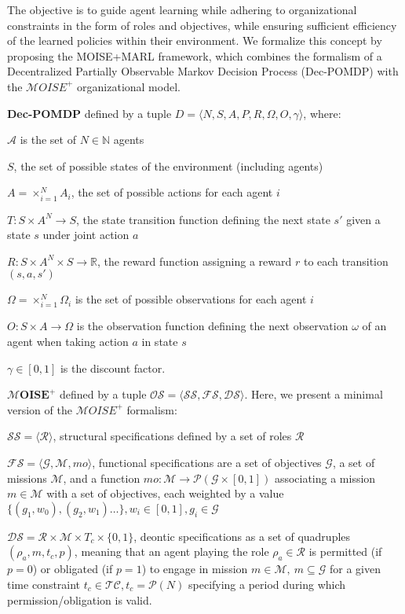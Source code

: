 \documentclass[sigconf,anonymous]{aamas}
\begin{document}
The objective is to guide agent learning while adhering to organizational constraints in the form of roles and objectives, while ensuring sufficient efficiency of the learned policies within their environment. We formalize this concept by proposing the MOISE+MARL framework, which combines the formalism of a Decentralized Partially Observable Markov Decision Process (Dec-POMDP) with the $\mathcal{M}OISE^+$ organizational model.

\textbf{Dec-POMDP} \quad defined by a tuple $D = \langle N, S, A, P, R, \Omega, O, \gamma \rangle$, where:
%
\begin{itemize*}[label={},itemjoin={; }]
    \item $\mathcal{A}$ is the set of $N \in \mathbb{N}$ agents
    \item $S$, the set of possible states of the environment (including agents)
    \item $A = \times_{i=1}^N A_i $, the set of possible actions for each agent $i$
    \item $T: S \times A^N \to S$, the state transition function defining the next state $s'$ given a state $s$ under joint action $a$
    \item $R: S \times A^N \times  S \to \mathbb{R}$, the reward function assigning a reward $r$ to each transition $(s, a, s')$
    \item $\Omega = \times_{i=1}^N \Omega_i $ is the set of possible observations for each agent $i$
    \item $O: S \times A \to \Omega$ is the observation function defining the next observation $\omega$ of an agent when taking action $a$ in state $s$
    \item $\gamma \in [0, 1] $ is the discount factor.
\end{itemize*}

$\mathbf{\mathcal{M}OISE^+}$ \quad defined by a tuple $\mathcal{OS} = \langle \mathcal{SS}, \mathcal{FS}, \mathcal{DS} \rangle$. Here, we present a minimal version of the $\mathcal{M}OISE^+$ formalism:
\begin{itemize*}[label={},itemjoin={; }]
    \item $\mathcal{SS} = \langle \mathcal{R} \rangle$, structural specifications defined by a set of roles $\mathcal{R}$
    \item $\mathcal{FS} = \langle \mathcal{G}, \mathcal{M}, mo \rangle$, functional specifications are a set of objectives $\mathcal{G}$, a set of missions $\mathcal{M}$, and a function $mo: \mathcal{M} \to \mathcal{P}(\mathcal{G} \times [0,1])$ associating a mission $m \in \mathcal{M}$ with a set of objectives, each weighted by a value $\{(g_1,w_0), (g_2,w_1)\dots\}, w_i \in [0,1], g_i \in \mathcal{G}$
    \item $\mathcal{DS} = \mathcal{R} \times \mathcal{M} \times T_c \times \{0,1\}$, deontic specifications as a set of quadruples $(\rho_a, m, \allowbreak t_c, p)$, meaning that an agent playing the role $\rho_a \in \mathcal{R}$ is permitted (if $p = 0$) or obligated (if $p = 1$) to engage in mission $m \in \mathcal{M}, \ m \subseteq \mathcal{G}$ for a given time constraint $t_c \in \mathcal{TC}, t_c = \mathcal{P}(N)$ specifying a period during which permission/obligation is valid.
\end{itemize*}
\end{document}
